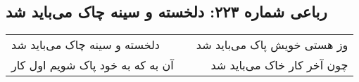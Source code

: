 \begin{center}
\section*{رباعی شماره ۲۲۳: دلخسته و سینه چاک می‌باید شد}
\label{sec:sh223}
\begin{longtable}{l p{0.5cm} r}
دلخسته و سینه چاک می‌باید شد
&&
وز هستی خویش پاک می‌باید شد
\\
آن به که به خود پاک شویم اول کار
&&
چون آخر کار خاک می‌باید شد
\\
\end{longtable}
\end{center}
